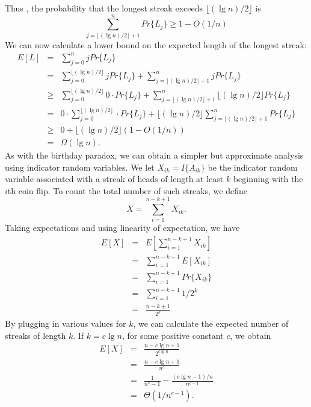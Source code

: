 \documentclass[12pt]{article}
\begin{document}
Thus , the probability that the longest streak exceeds $\lfloor (\lg n)/2 \rfloor$ is
\begin{equation*}
  \sum_{j = \lfloor (\lg n)/2 \rfloor + 1}^{n} Pr \{ L_j \} \ge 1 - O(1/n)
\end{equation*}
We can now calculate a lower bound on the expected length of the longest streak:
\begin{eqnarray*}
  E[L]
  &=& \sum_{j=0}^{n} j Pr \{ L_j \} \\
  &=& \sum_{j=0}^{\lfloor (\lg n)/2 \rfloor} j Pr \{ L_j \}
      + \sum_{j = \lfloor (\lg n)/2 \rfloor + 1}^{n} j Pr \{ L_j \} \\
  &\ge& \sum_{j=0}^{\lfloor (\lg n)/2 \rfloor} 0 \cdot Pr \{ L_j \}
      + \sum_{j = \lfloor (\lg n)/2 \rfloor + 1}^{n} 
      \lfloor (\lg n)/2 \rfloor Pr \{ L_j \} \\
  &=& 0 \cdot \sum_{j=0}^{\lfloor (\lg n)/2 \rfloor} \cdot Pr \{ L_j \}
      + \lfloor (\lg n)/2 \rfloor \sum_{j = \lfloor (\lg n)/2 \rfloor + 1}^{n}
      Pr \{ L_j \} \\
  &\ge& 0 + \lfloor (\lg n)/2 \rfloor (1 - O(1/n)) \\
  &=& \Omega (\lg n).
\end{eqnarray*}
As with the birthday paradox, we can obtain a simpler but approximate analysis using indicator random variables. We let $X_{ik} = I \{ A_{ik} \}$ be the indicator random variable associated with a streak of heads of length at least $k$ beginning with the $i$th coin flip. To count the total number of such streaks, we define
\begin{equation*}
  X = \sum_{i=1}^{n-k+1} X_{ik}.
\end{equation*}
Taking expectations and using linearity of expectation, we have
\begin{eqnarray*}
  E[X]
  &=& E \left[ \sum_{i=1}^{n-k+1} X_{ik} \right] \\
  &=& \sum_{i=1}^{n-k+1} E[X_{ik}] \\
  &=& \sum_{i=1}^{n-k+1} Pr \{ X_{ik} \} \\
  &=& \sum_{i=1}^{n-k+1} 1 / 2^k \\
  &=& \frac {n-k+1}{2^k}
\end{eqnarray*}
By plugging in various values for $k$, we can calculate the expected number of streaks of length $k$. If $k = c \lg n$, for some positive constant $c$, we obtain
\begin{eqnarray*}
  E[X]
  &=& \frac {n - c \lg n + 1}{2^{c \lg n}} \\
  &=& \frac {n - c \lg n + 1}{n^c} \\
  &=& \frac {1}{n^c - 1} - \frac {(c \lg n - 1)/n}{n^{c-1}} \\
  &=& \Theta(1 / n^{c-1}).
\end{eqnarray*}
\end{document}
